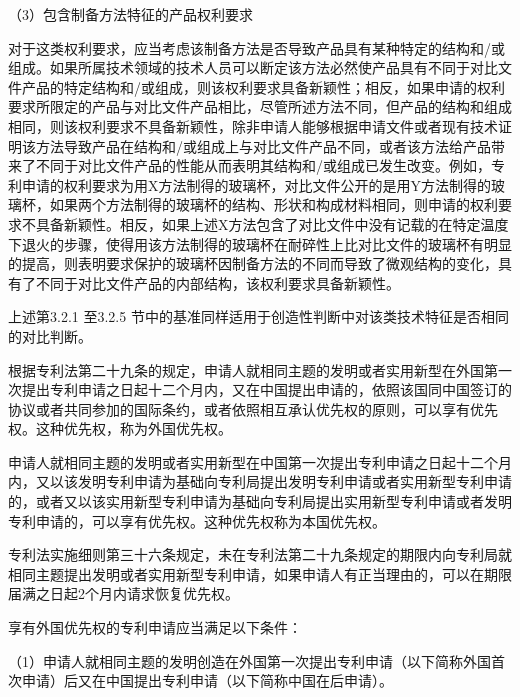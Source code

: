 {\setlength{\parindent}{17.1bp}（3）包含制备方法特征的产品权利要求\par}

对于这类权利要求，应当考虑该制备方法是否导致产品具有某种特定的结构和/或组成。如果所属技术领域的技术人员可以断定该方法必然使产品具有不同于对比文件产品的特定结构和/或组成，则该权利要求具备新颖性；相反，如果申请的权利要求所限定的产品与对比文件产品相比，尽管所述方法不同，但产品的结构和组成相同，则该权利要求不具备新颖性，除非申请人能够根据申请文件或者现有技术证明该方法导致产品在结构和/或组成上与对比文件产品不同，或者该方法给产品带来了不同于对比文件产品的性能从而表明其结构和/或组成已发生改变。例如，专利申请的权利要求为用X方法制得的玻璃杯，对比文件公开的是用Y方法制得的玻璃杯，如果两个方法制得的玻璃杯的结构、形状和构成材料相同，则申请的权利要求不具备新颖性。相反，如果上述X方法包含了对比文件中没有记载的在特定温度下退火的步骤，使得用该方法制得的玻璃杯在耐碎性上比对比文件的玻璃杯有明显的提高，则表明要求保护的玻璃杯因制备方法的不同而导致了微观结构的变化，具有了不同于对比文件产品的内部结构，该权利要求具备新颖性。

上述第3.2.1 至3.2.5 节中的基准同样适用于创造性判断中对该类技术特征是否相同的对比判断。

根据专利法第二十九条的规定，申请人就相同主题的发明或者实用新型在外国第一次提出专利申请之日起十二个月内，又在中国提出申请的，依照该国同中国签订的协议或者共同参加的国际条约，或者依照相互承认优先权的原则，可以享有优先权。这种优先权，称为外国优先权。

申请人就相同主题的发明或者实用新型在中国第一次提出专利申请之日起十二个月内，又以该发明专利申请为基础向专利局提出发明专利申请或者实用新型专利申请的，或者又以该实用新型专利申请为基础向专利局提出实用新型专利申请或者发明专利申请的，可以享有优先权。这种优先权称为本国优先权。

专利法实施细则第三十六条规定，未在专利法第二十九条规定的期限内向专利局就相同主题提出发明或者实用新型专利申请，如果申请人有正当理由的，可以在期限届满之日起2个月内请求恢复优先权。

享有外国优先权的专利申请应当满足以下条件：

{\setlength{\parindent}{17.1bp}（1）申请人就相同主题的发明创造在外国第一次提出专利申请（以下简称外国首次申请）后又在中国提出专利申请（以下简称中国在后申请）。\par}

